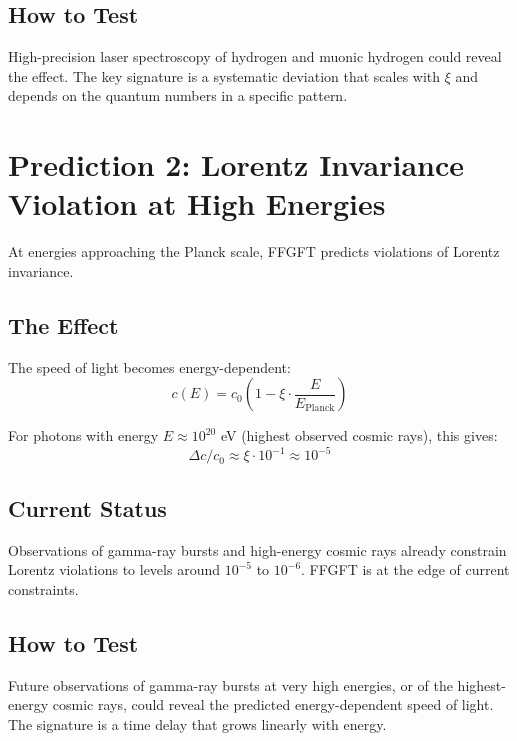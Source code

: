 \subsection{How to Test}

High-precision laser spectroscopy of hydrogen and muonic hydrogen could reveal the effect. The key signature is a systematic deviation that scales with $\xi$ and depends on the quantum numbers in a specific pattern.

\section{Prediction 2: Lorentz Invariance Violation at High Energies}

At energies approaching the Planck scale, FFGFT predicts violations of Lorentz invariance.

\subsection{The Effect}

The speed of light becomes energy-dependent:
\begin{equation}
c(E) = c_0 \left(1 - \xi \cdot \frac{E}{E_{\text{Planck}}}\right)
\end{equation}

For photons with energy $E \approx 10^{20}$ eV (highest observed cosmic rays), this gives:
\begin{equation}
\Delta c / c_0 \approx \xi \cdot 10^{-1} \approx 10^{-5}
\end{equation}

\subsection{Current Status}

Observations of gamma-ray bursts and high-energy cosmic rays already constrain Lorentz violations to levels around $10^{-5}$ to $10^{-6}$. FFGFT is at the edge of current constraints.

\subsection{How to Test}

Future observations of gamma-ray bursts at very high energies, or of the highest-energy cosmic rays, could reveal the predicted energy-dependent speed of light. The signature is a time delay that grows linearly with energy.

